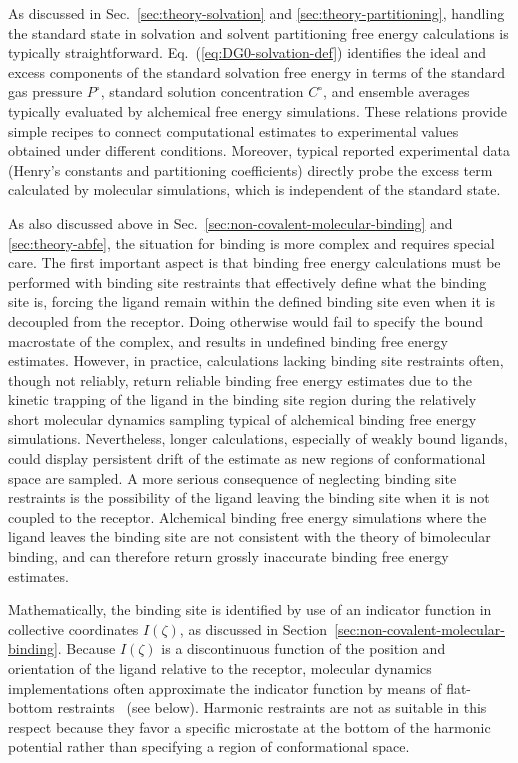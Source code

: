 \documentclass[9pt,bestpractices]{livecoms}
\begin{document}
As discussed in Sec.~\ref{sec:theory-solvation} and \ref{sec:theory-partitioning}, handling the standard state in solvation and solvent partitioning free energy calculations is typically straightforward. Eq.~(\ref{eq:DG0-solvation-def}) identifies the ideal and excess components of the standard solvation free energy in terms of the standard gas pressure $P^\circ$, standard solution concentration $C^\circ$, and ensemble averages typically evaluated by alchemical free energy simulations. These relations provide simple recipes to connect computational estimates to experimental values obtained under different conditions. Moreover, typical reported experimental data (Henry's constants and partitioning coefficients) directly probe the excess term calculated by molecular simulations, which is independent of the standard state.

As also discussed above in Sec.~\ref{sec:non-covalent-molecular-binding} and \ref{sec:theory-abfe}, the situation for binding is more complex and requires special care. The first important aspect is that binding free energy calculations must be performed with binding site restraints that effectively define what the binding site is, forcing the ligand remain within the defined binding site even when it is decoupled from the receptor. Doing otherwise would fail to specify the bound macrostate of the complex, and results in undefined binding free energy estimates. However, in practice, calculations lacking binding site restraints often, though not reliably, return reliable binding free energy estimates due to the kinetic trapping of the ligand in the binding site region during the relatively short molecular dynamics sampling typical of alchemical binding free energy simulations. Nevertheless, longer calculations, especially of weakly bound ligands, could display persistent drift of the estimate as new regions of conformational space are sampled. A more serious consequence of neglecting binding site restraints is the possibility of the ligand leaving the binding site when it is not coupled to the receptor. Alchemical binding free energy simulations where the ligand leaves the binding site are not consistent with the theory of bimolecular binding, and can therefore return grossly inaccurate binding free energy estimates.

Mathematically, the binding site is identified by use of an indicator function in collective coordinates $I(\zeta)$, as discussed in Section~\ref{sec:non-covalent-molecular-binding}. Because $I(\zeta)$ is a discontinuous function of the position and orientation of the ligand relative to the receptor, molecular dynamics implementations often approximate the indicator function by means of flat-bottom restraints~\cite{chen2007can, wu2021alchemical} (see below). Harmonic restraints are not as suitable in this respect because they favor a specific microstate at the bottom of the harmonic potential rather than specifying a region of conformational space.
\end{document}
